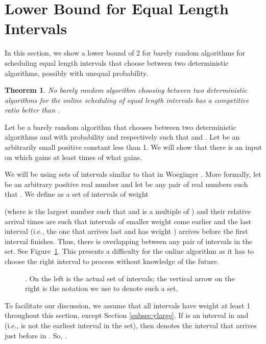 \documentclass[11pt]{article}
\newtheorem{theorem}{Theorem}[section]
\begin{document}
\section{Lower Bound for Equal Length Intervals}
  \label{sec:LB}

In this section, we show a lower bound of 2 for barely
random algorithms for scheduling equal length intervals
that choose between two deterministic algorithms,
possibly with unequal probability.

\begin{theorem}
No barely random algorithm choosing between two deterministic algorithms
for the online scheduling of equal length intervals
has a competitive ratio better than .
\end{theorem}

Let  be a barely random algorithm that chooses between 
two deterministic algorithms  and  with 
probability  and  respectively
such that  and .
Let  be an arbitrarily small positive constant
less than 1.
We will show that there is an input on which 
gains at least  times of what  gains.

We will be using sets of intervals similar to
that in Woeginger \cite{Woeg94}.
More formally, let  be an arbitrary positive real number
and let  be any pair of real numbers such that
. 
We define  as a set of intervals of weight 
 
(where  is the largest number 
such that  and 
 is a multiple of )
and their relative arrival times are such that
intervals of smaller weight come earlier
and the last interval
(i.e., the one that arrives last and has weight )
arrives before the first interval finishes.
Thus, there is overlapping between any pair of
intervals in the set.
See Figure~\ref{fig:set}.
This presents a difficulty for the online algorithm
as it has to choose the right interval to process
without knowledge of the future.

\begin{figure}
\centerline{ \epsfysize=1.2in  }
\caption{.  On the left is the actual set of 
intervals; the vertical arrow on the right is the notation we use to denote 
such a set.}
\label{fig:set}
\end{figure}

To facilitate our discussion, 
we assume that all intervals have weight at least 1
throughout this section, except Section \ref{subsec:ylarge}.
If  is an interval in  and 
(i.e.,  is not the earliest interval in the set),
then  denotes the interval
that arrives just before  in .
So, .
\end{document}
